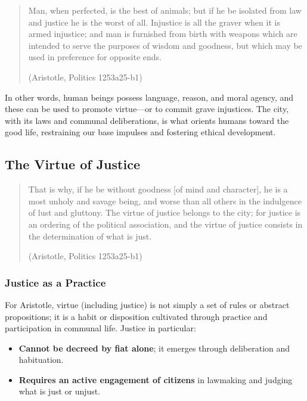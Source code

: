                 \begin{quote}
                    Man, when perfected, is the best of animals; but if he be isolated from law and justice he is the worst of all. Injustice is all the graver when it is armed injustice; and man is furnished from birth with weapons which are intended to serve the purposes of wisdom and goodness, but which may be used in preference for opposite ends.

                    (Aristotle, Politics 1253a25-b1)
                \end{quote}

                In other words, human beings possess language, reason, and moral agency, and these can be used to promote virtue—or to commit grave injustices. The city, with its laws and communal deliberations, is what orients humans toward the good life, restraining our base impulses and fostering ethical development.

            \subsection{The Virtue of Justice}

                \begin{quote}
                    That is why, if he be without goodness [of mind and character], he is a most unholy and savage being, and worse than all others in the indulgence of lust and gluttony. The virtue of justice belongs to the city; for justice is an ordering of the political association, and the virtue of justice consists in the determination of what is just.

                    (Aristotle, Politics 1253a25-b1)
                \end{quote}

                \subsubsection{Justice as a Practice}

                    For Aristotle, virtue (including justice) is not simply a set of rules or abstract propositions; it is a habit or disposition cultivated through practice and participation in communal life. Justice in particular:

                    \begin{itemize}
                        \item \textbf{Cannot be decreed by fiat alone}; it emerges through deliberation and habituation.
                        \item \textbf{Requires an active engagement of citizens} in lawmaking and judging what is just or unjust.
                    \end{itemize}

